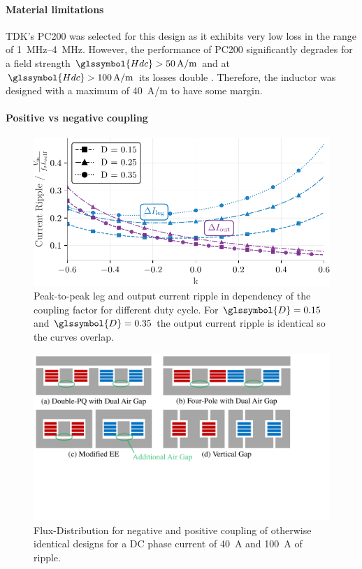 \documentclass{IPEC2026}
\newcommand{\sbl}[1]{\glssymbol{#1}}
\begin{document}
\paragraph{Material limitations}
TDK's PC200 was selected for this design as it exhibits very low loss in the range of \qtyrange{1}{4}{\MHz}. However, the performance of PC200 significantly degrades for a field strength $\sbl{Hdc} > \qty{50}{A/m}$ and at $\sbl{Hdc} > \qty{100}{A/m}$ its losses double%
\cite{tdkHighFrequencyLowLossFerrite}. Therefore, the inductor was designed with a maximum \sbl{Hdc} of \qty{40}{A/m} to have some margin.

\paragraph{Positive vs negative coupling}
\begin{figure}
    \centering
    \includegraphics[width=0.95\columnwidth]{figures/Python/current_ripple_plot.pdf}
    \caption{Peak-to-peak leg and output current ripple in dependency of the coupling factor for different duty cycle. For $\sbl{D}=0.15$ and $\sbl{D}=0.35$ the output current ripple is identical so the curves overlap.}
    \label{fig:OutputAndLegRipple}
\end{figure}
\begin{figure}
  \includegraphics[page=3, trim = 0cm 1cm 3.5cm 0cm, clip, width=\columnwidth]{figures/IPEC_Figures_PowerPoint.pdf}
  \caption{Flux-Distribution for negative and positive coupling of otherwise identical designs for a DC phase current of \qty{40}{\A} and \qty{100}{\A} of ripple.}
  \label{fig:Fluxposneg}
\end{figure}
\end{document}
